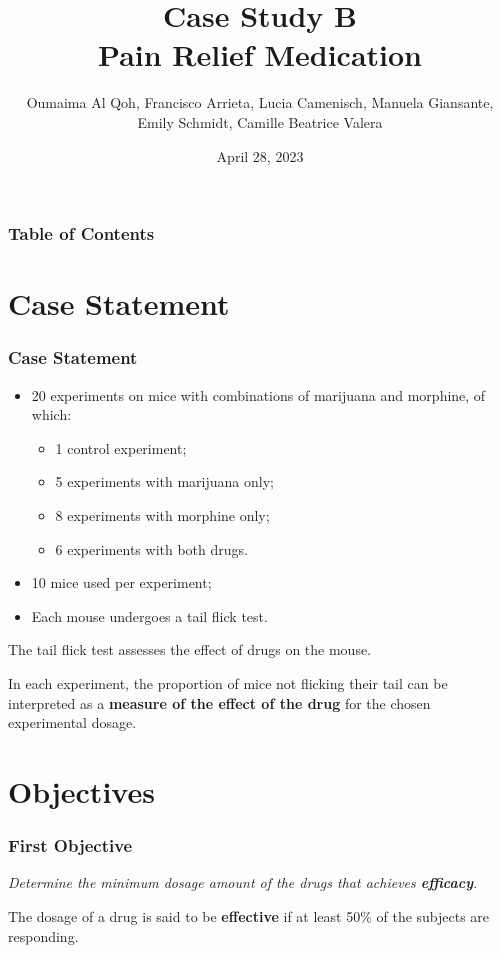 \documentclass[14pt]{beamer}
\author{Oumaima Al Qoh, Francisco Arrieta, Lucia Camenisch, Manuela Giansante, Emily Schmidt, Camille Beatrice Valera}
\title{Case Study B \\ Pain Relief Medication}
\date{April 28, 2023}
\begin{document}
\begin{frame}
\titlepage
\end{frame}



\begin{frame}
\frametitle{Table of Contents}
\tableofcontents
\end{frame}


\section{Case Statement}
\begin{frame}
\frametitle{Case Statement}
\begin{itemize}[label={$\blacktriangleright$}]
\item 20 experiments on mice with combinations of marijuana and morphine, of which:
\begin{itemize}[label={$\blacktriangleright$}]
\item 1 control experiment;
\item 5 experiments with marijuana only;
\item 8 experiments with morphine only;
\item 6 experiments with both drugs.
\end{itemize}
\item 10 mice used per experiment;
\item Each mouse undergoes a tail flick test.
\end{itemize}
\end{frame}

\begin{frame}
The tail flick test assesses the effect of drugs on the mouse.

\bigskip

In each experiment, the proportion of mice not flicking their tail can be interpreted as a \textbf{measure of the effect of the drug} for the chosen experimental dosage.
\end{frame}

\section{Objectives}
\begin{frame}
\frametitle{First Objective}
\textit{Determine the minimum dosage amount of the drugs that achieves \textbf{efficacy}.}

\bigskip

The dosage of a drug is said to be \textbf{effective} if at least 50\% of the subjects are responding.
\end{frame}
\end{document}
